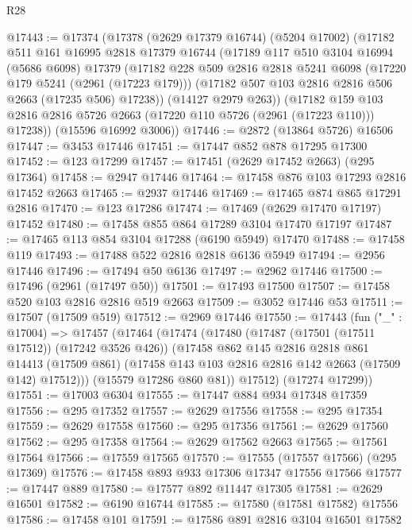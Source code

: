 \begin{lexlean}{R28}
\begin{coremodule}
@17443 := @17374
    (@17378
      (@2629 @17379 @16744)
      (@5204 @17002)
      (@17182
        @511
        @161
        @16995
        @2818
        @17379
        @16744
        (@17189
          @117
          @510
          @3104
          @16994
          (@5686 @6098)
          @17379
          (@17182
            @228
            @509
            @2816
            @2818
            @5241
            @6098
            (@17220 @179 @5241 (@2961 (@17223 @179)))
            (@17182 @507 @103 @2816 @2816 @506 @2663 (@17235 @506) @17238))
          (@14127 @2979 @263))
        (@17182 @159 @103 @2816 @2816 @5726 @2663 (@17220 @110 @5726 (@2961 (@17223 @110))) @17238))
      (@15596 @16992 @3006))
@17446 := @2872 (@13864 @5726) @16506
@17447 := @3453 @17446
@17451 := @17447 @852 @878 @17295 @17300
@17452 := @123 @17299
@17457 := @17451 (@2629 @17452 @2663) (@295 @17364)
@17458 := @2947 @17446
@17464 := @17458 @876 @103 @17293 @2816 @17452 @2663
@17465 := @2937 @17446
@17469 := @17465 @874 @865 @17291 @2816
@17470 := @123 @17286
@17474 := @17469 (@2629 @17470 @17197) @17452
@17480 := @17458 @855 @864 @17289 @3104 @17470 @17197
@17487 := @17465 @113 @854 @3104 @17288 (@6190 @5949) @17470
@17488 := @17458 @119
@17493 := @17488 @522 @2816 @2818 @6136 @5949
@17494 := @2956 @17446
@17496 := @17494 @50 @6136
@17497 := @2962 @17446
@17500 := @17496 (@2961 (@17497 @50))
@17501 := @17493 @17500
@17507 := @17458 @520 @103 @2816 @2816 @519 @2663
@17509 := @3052 @17446 @53
@17511 := @17507 (@17509 @519)
@17512 := @2969 @17446
@17550 := @17443
    (fun ("_" : @17004) =>
    @17457
      (@17464
        (@17474
          (@17480
            (@17487 (@17501 (@17511 @17512)) (@17242 @3526 @426))
            (@17458
              @862
              @145
              @2816
              @2818
              @861
              @14413
              (@17509 @861)
              (@17458 @143 @103 @2816 @2816 @142 @2663 (@17509 @142) @17512)))
          (@15579 @17286 @860 @81))
        @17512)
      (@17274 @17299))
@17551 := @17003 @6304
@17555 := @17447 @884 @934 @17348 @17359
@17556 := @295 @17352
@17557 := @2629 @17556
@17558 := @295 @17354
@17559 := @2629 @17558
@17560 := @295 @17356
@17561 := @2629 @17560
@17562 := @295 @17358
@17564 := @2629 @17562 @2663
@17565 := @17561 @17564
@17566 := @17559 @17565
@17570 := @17555 (@17557 @17566) (@295 @17369)
@17576 := @17458 @893 @933 @17306 @17347 @17556 @17566
@17577 := @17447 @889
@17580 := @17577 @892 @11447 @17305
@17581 := @2629 @16501
@17582 := @6190 @16744
@17585 := @17580 (@17581 @17582) @17556
@17586 := @17458 @101
@17591 := @17586 @891 @2816 @3104 @16501 @17582

\end{coremodule}
\end{lexlean}
